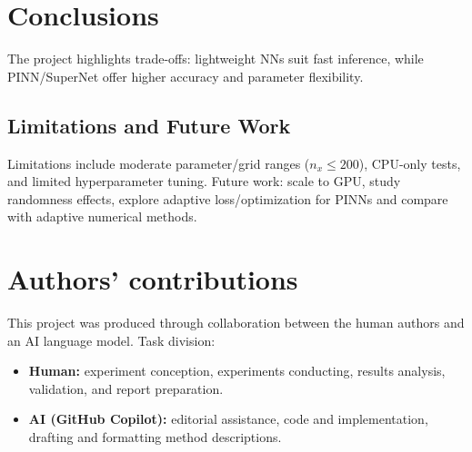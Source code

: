 \documentclass[a4paper,11pt]{article}
\begin{document}
\section{Conclusions}
The project highlights trade-offs: lightweight NNs suit fast inference, while PINN/SuperNet offer higher accuracy and parameter flexibility.

\subsection*{Limitations and Future Work}
Limitations include moderate parameter/grid ranges ($n_x \le 200$), CPU-only tests, and limited hyperparameter tuning. Future work: scale to GPU, study randomness effects, explore adaptive loss/optimization for PINNs and compare with adaptive numerical methods.

\section{Authors' contributions}
This project was produced through collaboration between the human authors and an AI language model. Task division:
\begin{itemize}
  \item \textbf{Human:} experiment conception, experiments conducting, results analysis, validation, and report preparation.
  \item \textbf{AI (GitHub Copilot):} editorial assistance, code and implementation, drafting and formatting method descriptions.
\end{itemize}


\nocite{*}

\end{document}
